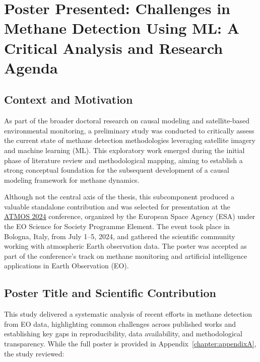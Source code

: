 \cleardoublepage
\label{chap:implement}


\section{Poster Presented: Challenges in Methane Detection Using ML: A Critical Analysis and Research Agenda}

\subsection{Context and Motivation}

As part of the broader doctoral research on causal modeling and satellite-based environmental monitoring, a preliminary study was conducted to critically assess the current state of methane detection methodologies leveraging satellite imagery and machine learning (ML). This exploratory work emerged during the initial phase of literature review and methodological mapping, aiming to establish a strong conceptual foundation for the subsequent development of a causal modeling framework for methane dynamics.

Although not the central axis of the thesis, this subcomponent produced a valuable standalone contribution and was selected for presentation at the \href{https://www.atmos2024.org/}{ATMOS 2024} conference, organized by the European Space Agency (ESA) under the EO Science for Society Programme Element. The event took place in Bologna, Italy, from July 1--5, 2024, and gathered the scientific community working with atmospheric Earth observation data. The poster was accepted as part of the conference’s track on methane monitoring and artificial intelligence applications in Earth Observation (EO).

\subsection{Poster Title and Scientific Contribution}

This study delivered a systematic analysis of recent efforts in methane detection from EO data, highlighting common challenges across published works and establishing key gaps in reproducibility, data availability, and methodological transparency. While the full poster is provided in Appendix~\ref{chapter:appendixA}, the study reviewed:

